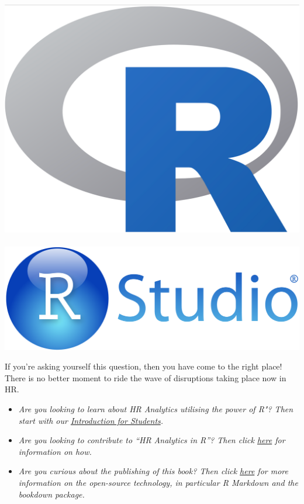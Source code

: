 \documentclass[
  12pt, krantz2,
]{krantz}
\providecommand{\tightlist}{%
  \setlength{\itemsep}{0pt}\setlength{\parskip}{0pt}}
\begin{document}
\includegraphics[width=\textwidth,height=0.2\textheight]{images/Rlogo.png} \hfill         \includegraphics[width=\textwidth,height=0.2\textheight]{images/RStudio-Logo-Blue-Gradient.png}

If you're asking yourself this question, then you have come to the right place! There is no better moment to ride the wave of disruptions taking place now in HR.

\begin{itemize}
\tightlist
\item
  \emph{Are you looking to learn about HR Analytics utilising the power of R"? Then start with our \protect\hyperlink{sec:intro-for-students}{Introduction for Students}.}
\item
  \emph{Are you looking to contribute to ``HR Analytics in R''? Then click \protect\hyperlink{sec:connect-contribute}{here} for information on how.}
\item
  \emph{Are you curious about the publishing of this book? Then click \protect\hyperlink{sec:about-book}{here} for more information on the open-source technology, in particular R Markdown and the bookdown package.}
\end{itemize}
\end{document}
